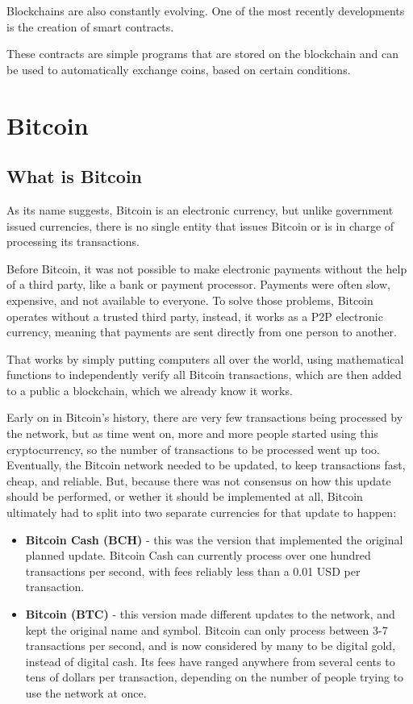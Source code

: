 \documentclass{article}
\newcommand\tab[1][1cm]{\hspace*{#1}}
\begin{document}
\tab Blockchains are also constantly evolving. One of the most recently developments is the creation of smart contracts.

These contracts are simple programs that are stored on the blockchain and can be used to automatically exchange coins, based on certain conditions.

\section{Bitcoin}

\subsection{What is Bitcoin}

\tab As its name suggests, Bitcoin is an electronic currency, but unlike government issued currencies, there is no single entity that issues Bitcoin or is in charge of processing its transactions. 

Before Bitcoin, it was not possible to make electronic payments without the help of a third party, like a bank or payment processor. Payments were often slow, expensive, and not available to everyone. To solve those problems, Bitcoin operates without a trusted third party, instead, it works as a P2P electronic currency, meaning that payments are sent directly from one person to another.

That works by simply putting computers all over the world, using mathematical functions to independently verify all Bitcoin transactions, which are then added to a public a blockchain, which we already know it works.

Early on in Bitcoin's history, there are very few transactions being processed by the network, but as time went on, more and more people started using this cryptocurrency, so the number of transactions to be processed went up too. Eventually, the Bitcoin network needed to be updated, to keep transactions fast, cheap, and reliable. But, because there was not consensus on how this update should be performed, or wether it should be implemented at all, Bitcoin ultimately had to split into two separate currencies for that update to happen:

\begin{itemize}
    \item \textbf{Bitcoin Cash (BCH)} - this was the version that implemented the original planned update. Bitcoin Cash can currently process over one hundred transactions per second, with fees reliably less than a 0.01 USD per transaction.
    \item \textbf{Bitcoin (BTC)} - this version made different updates to the network, and kept the original name and symbol. Bitcoin can only process between 3-7 transactions per second, and is now considered by many to be digital gold, instead of digital cash. Its fees have ranged anywhere from several cents to tens of dollars per transaction, depending on the number of people trying to use the network at once.
\end{itemize}
\end{document}
